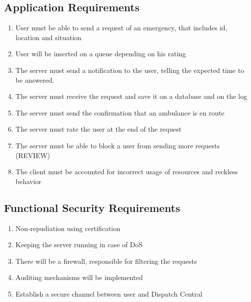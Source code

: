 \documentclass[a4paper,titlepage,11pt]{article}
\begin{document}
	\subsection{Application Requirements}
		\begin{enumerate}
			\item User must be able to send a request of an emergency, that includes id, location and situation

			\item User will be inserted on a queue depending on his rating
			
			\item The server must send a notification to the user, telling the expected time to be answered. 

			\item The server must receive the request and save it on a database and on the log

			\item The server must send the confirmation that an ambulance is en route 

			\item The server must rate the user at the end of the request

			\item The server must be able to block a user from sending more requests (REVIEW)

			\item The client must be accounted for incorrect usage of resources and reckless behavior

 
		\end{enumerate}

	\subsection{Functional Security Requirements}
		\begin{enumerate}
			\item Non-repudiation using certification
			
			\item Keeping the server running in case of DoS
			
			\item There will be a firewall, responsible for filtering the requests

			\item Auditing mechanisms will be implemented

			\item Establish a secure channel between user and Dispatch Central

		\end{enumerate}
\end{document}

